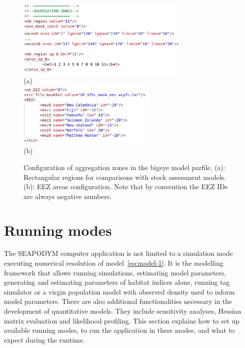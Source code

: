 \newpage
\begin{figure}[H]
   \centering
    \vbox{
    \includegraphics[width=0.75\textwidth]{chapter3/figs/aggregation_zones_1}\\
    (a)\\
     \includegraphics[width=0.6\textwidth]{chapter3/figs/aggregation_zones_2}\\
    (b)\\
   }
   \caption{
   Configuration of aggregation zones in the bigeye model parfile. (a): Rectangular regions for comparisons with stock assessment models. (b): EEZ areas configuration. Note that by convention the EEZ IDs are always negative numbers.}
   \label{fig:aggregation_zones}
 \end{figure}


\section{Running modes}\label{sec:running-modes}

The SEAPODYM computer application is not limited to a simulation mode executing numerical resolution of model~\ref{eq:model-1}. It is the modelling framework that allows running simulations, estimating model parameters, generating and estimating parameters of habitat indices alone, running tag simulator or a virgin population model with observed density used to inform model parameters. There are also additional functionalities necessary in the development of quantitative models. They include sensitivity analyses, Hessian matrix evaluation and likelihood profiling. This section explains how to set up available running modes, to run the application in these modes, and what to expect during the runtime. 


